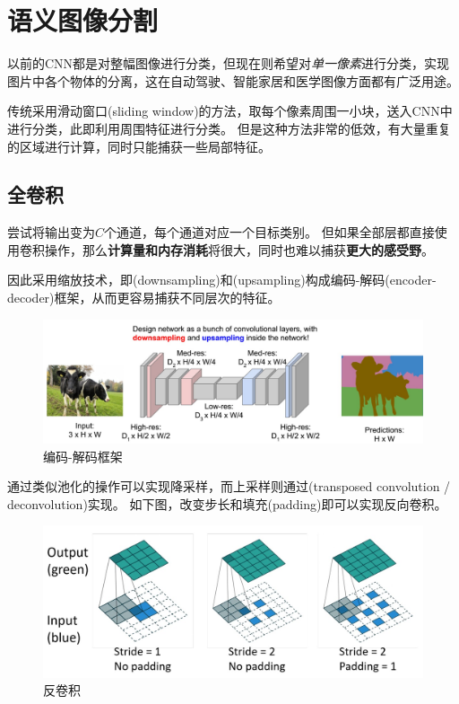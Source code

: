 
\section{语义图像分割}
以前的CNN都是对整幅图像进行分类，但现在则希望对\emph{单一像素}进行分类，实现图片中各个物体的分离，这在自动驾驶、智能家居和医学图像方面都有广泛用途。

传统采用滑动窗口(sliding window)的方法，取每个像素周围一小块，送入CNN中进行分类，此即利用周围特征进行分类。
但是这种方法非常的低效，有大量重复的区域进行计算，同时只能捕获一些局部特征。

\subsection{全卷积}
尝试将输出变为$C$个通道，每个通道对应一个目标类别。
但如果全部层都直接使用卷积操作，那么\textbf{计算量和内存消耗}将很大，同时也难以捕获\textbf{更大的感受野}。

因此采用缩放技术，即(downsampling)和(upsampling)构成编码-解码(encoder-decoder)框架，从而更容易捕获不同层次的特征。
\begin{figure}[H]
\centering
\includegraphics[width=0.9\linewidth]{fig/encoder-decoder.jpg}
\caption{编码-解码框架}
\end{figure}

通过类似池化的操作可以实现降采样，而上采样则通过(transposed convolution / deconvolution)实现。
如下图，改变步长和填充(padding)即可以实现反向卷积。
\begin{figure}[H]
\centering
\includegraphics[width=0.8\linewidth]{fig/deconvolution.jpg}
\caption{反卷积}
\end{figure}

